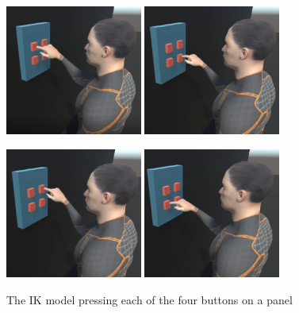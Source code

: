 \begin{figure}[h!]
    \centering
    \captionsetup{justification=centering}
    \includegraphics[width=0.4\textwidth]{grafika/h_ik_1.eps}
        \hspace{0.1cm}
    \includegraphics[width=0.4\textwidth]{grafika/h_ik_2.eps}

    \vspace{0.2cm}
    \includegraphics[width=0.4\textwidth]{grafika/h_ik_3.eps}
        \hspace{0.1cm}
    \includegraphics[width=0.4\textwidth]{grafika/h_ik_4.eps}
    \caption{The IK model pressing each of the four buttons on a panel}
    \label{fig:h_ik_multiple}
\end{figure}



